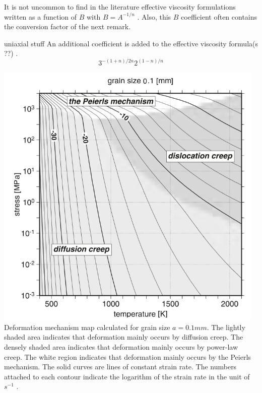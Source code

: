 \begin{remark}
It is not uncommon to find in the literature effective viscosity formulations written as a function 
of $B$ with $B=A^{-1/n}$ \cite{wabj08,wabj08b,wabj08c}. Also, this $B$ coefficient often contains the conversion 
factor of the next remark.
\end{remark}

\begin{remark}
uniaxial stuff 
An additional coefficient is added to the effective viscosity formula(s ??) \cite{grpy12,grpy13}.
\[
3^{-(1+n)/2n}2^{(1-n)/n}
\] 
\cite{ranalli}
\end{remark}

\begin{center}
\includegraphics[width=13cm]{images/rheology/defmap}\\
{\captionfont Deformation mechanism map calculated for grain size $a=0.1mm$. The lightly shaded area indicates 
that deformation mainly occurs by diffusion creep. The densely shaded area indicates that 
deformation mainly occurs by power-law creep. 
The white region indicates that deformation mainly occurs by the Peierls mechanism. The 
solid curves are lines of constant strain rate. The numbers attached to each contour indicate the 
logarithm of the strain rate in the unit of $s^{-1}$ \cite{kayk99}.}
\end{center}


